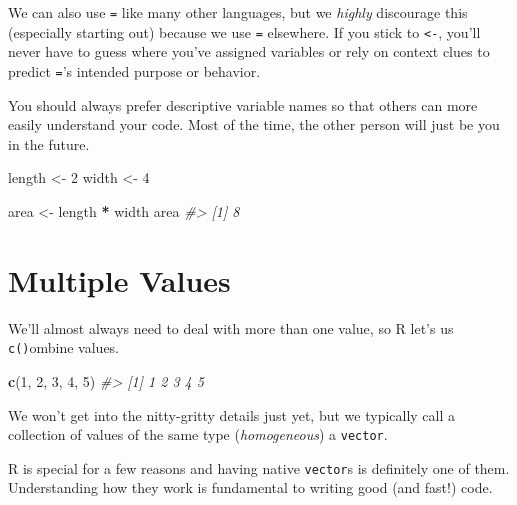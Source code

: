 \documentclass[
]{report}
\newenvironment{Shaded}{\begin{snugshade}}{\end{snugshade}}
\newcommand{\CommentTok}[1]{\textcolor[rgb]{0.56,0.35,0.01}{\textit{#1}}}
\newcommand{\DecValTok}[1]{\textcolor[rgb]{0.00,0.00,0.81}{#1}}
\newcommand{\KeywordTok}[1]{\textcolor[rgb]{0.13,0.29,0.53}{\textbf{#1}}}
\newcommand{\NormalTok}[1]{#1}
\newcommand{\OperatorTok}[1]{\textcolor[rgb]{0.81,0.36,0.00}{\textbf{#1}}}
\newcommand{\StringTok}[1]{\textcolor[rgb]{0.31,0.60,0.02}{#1}}
\begin{document}
We can also use \texttt{=} like many other languages, but we \emph{highly} discourage this (especially starting out) because we use \texttt{=} elsewhere. If you stick to \texttt{\textless{}-}, you'll never have to guess where you've assigned variables or rely on context clues to predict \texttt{=}'s intended purpose or behavior.

You should always prefer descriptive variable names so that others can more easily understand your code. Most of the time, the other person will just be you in the future.

\begin{Shaded}
\begin{Highlighting}[]
\NormalTok{length \textless{}{-}}\StringTok{ }\DecValTok{2}
\NormalTok{width \textless{}{-}}\StringTok{ }\DecValTok{4}

\NormalTok{area \textless{}{-}}\StringTok{ }\NormalTok{length }\OperatorTok{*}\StringTok{ }\NormalTok{width}
\NormalTok{area}
\CommentTok{\#\textgreater{} [1] 8}
\end{Highlighting}
\end{Shaded}

\hypertarget{multiple-values}{%
\section{Multiple Values}\label{multiple-values}}

We'll almost always need to deal with more than one value, so R let's us \texttt{c()}ombine values.

\begin{Shaded}
\begin{Highlighting}[]
\KeywordTok{c}\NormalTok{(}\DecValTok{1}\NormalTok{, }\DecValTok{2}\NormalTok{, }\DecValTok{3}\NormalTok{, }\DecValTok{4}\NormalTok{, }\DecValTok{5}\NormalTok{)}
\CommentTok{\#\textgreater{} [1] 1 2 3 4 5}
\end{Highlighting}
\end{Shaded}

We won't get into the nitty-gritty details just yet, but we typically call a collection of values of the same type (\emph{homogeneous}) a \texttt{vector}.

R is special for a few reasons and having native \texttt{vector}s is definitely one of them. Understanding how they work is fundamental to writing good (and fast!) code.
\end{document}
